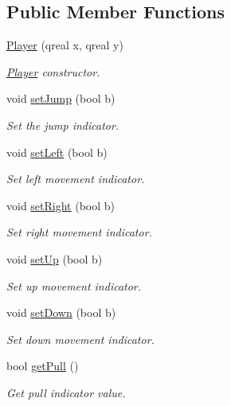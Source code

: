 \subsection*{Public Member Functions}
\begin{DoxyCompactItemize}
\item 
\hyperlink{class_player_a623f0a82827dbd74758a90cefe4123d2}{Player} (qreal x, qreal y)
\begin{DoxyCompactList}\small\item\em \hyperlink{class_player}{Player} constructor. \end{DoxyCompactList}\item 
void \hyperlink{class_player_a5add9f5bf703663538a25234bdd93291}{set\+Jump} (bool b)
\begin{DoxyCompactList}\small\item\em Set the jump indicator. \end{DoxyCompactList}\item 
void \hyperlink{class_player_a19eb681affb69020b7b5638c435be08f}{set\+Left} (bool b)
\begin{DoxyCompactList}\small\item\em Set left movement indicator. \end{DoxyCompactList}\item 
void \hyperlink{class_player_ae6f8aeb9f247fa3cd5204a61ee491285}{set\+Right} (bool b)
\begin{DoxyCompactList}\small\item\em Set right movement indicator. \end{DoxyCompactList}\item 
void \hyperlink{class_player_a2a910876c4833690e05e50acfd2333a4}{set\+Up} (bool b)
\begin{DoxyCompactList}\small\item\em Set up movement indicator. \end{DoxyCompactList}\item 
void \hyperlink{class_player_a9a5e1acdaf939df0cde9b54d6a88e79d}{set\+Down} (bool b)
\begin{DoxyCompactList}\small\item\em Set down movement indicator. \end{DoxyCompactList}\item 
bool \hyperlink{class_player_a0a2bc2291e910c06bde3c6c9d4173cd1}{get\+Pull} ()
\begin{DoxyCompactList}\small\item\em Get pull indicator value. \end{DoxyCompactList}\item 

\end{DoxyCompactItemize}
